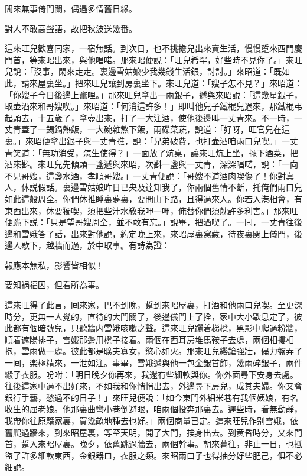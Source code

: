 \begin{myquote}
閒來無事倚門闌，偶遇多情舊日緣。

對人不敢高聲語，故把秋波送幾番。
\end{myquote}

這來旺兒歡喜囘家，一宿無話。到次日，也不挑擔兒出來賣生活，慢慢踅來西門慶門首，等來昭出來，與他唱喏。那來昭便說：「旺兒希罕，好些時不見你了。」來旺兒說：「沒事，閑來走走。裏邊雪姑娘少我幾錢生活銀，討討。」來昭道：「既如此，請來屋裏坐。」把來旺兒讓到房裏坐下。來旺兒道：「嫂子怎不見？」來昭道：「你嫂子今日後邊上竃哩。」那來旺兒拿出一兩銀子，遞與來昭說：「這幾星銀子，取壶酒來和哥嫂喫。」來昭道：「何消這許多！」即叫他兒子鐵棍兒過來，那鐵棍弔起頭去，十五歲了，拿壺出來，打了一大注酒，使他後邊叫一丈青來。不一時，一丈青蓋了一錫鍋熱飯，一大碗雜熬下飯，兩碟菜蔬，說道：「好呀，旺官兒在這裏。」來昭便拿出銀子與一丈青瞧，說：「兄弟破費，也打壶酒咱兩口兒喫。」一丈青笑道：「無功消受，怎生使得？」一面放了炕桌，讓來旺炕上坐，擺下酒菜，把酒來斟。來旺兒先傾頭一盞遞與來昭，次斟一盞與一丈青，深深唱喏，說：「一向不見哥嫂，這盞水酒，孝順哥嫂。」一丈青便說：「哥嫂不道酒肉喫傷了！你對真人，休説假話。裏邊雪姑娘昨日已央及逹知我了，你兩個舊情不斷，托俺們兩口兒如此這般周全。你們休推睡裏夢裏，要問山下路，且得過來人。你若入港相會，有東西出來，休要獨喫，須把些汁水敎我呷一呷，俺替你們須躭許多利害。」那來旺便跪下説：「只是望哥嫂周全，並不敢有忘。」說畢，把酒喫了。一囘，一丈青往後邊和雪娥答了話，出來對他說，約定晚上來，來昭屋裏窝藏，待夜裏関上儀門，後邊人歇下，越牆而過，於中取事。有詩為證：

\begin{myquote}
報應本無私，影響皆相似！

要知祸福因，但看所為事。
\end{myquote}

這來旺得了此言，囘來家，巴不到晚，踅到來昭屋裏，打酒和他兩口兒喫。至更深時分，更無一人覺的，直待的大門關了，後邊儀門上了拴，家中大小歇息定了，彼此都有個暗號兒，只聽牆内雪娥咳嗽之聲。這來旺兒躧着梯櫈，黑影中爬過粉牆，順着遮陽排子，雪娥那邊用櫈子接着。兩個在西耳房堆馬鞍子去處，兩個相摟相抱，雲雨做一處。彼此都是曠夫寡女，慾心如火。那來旺兒纓鎗強壯，儘力盤弄了一囘，楽極精來，一泄如注。事畢，雪娥遞與他一包金銀首飾，幾兩碎銀子，兩件緞子衣服。吩咐：「明日晚夕你再來，我還有些細軟與你。你外面尋下安身去處。往後這家中過不出好來，不如我和你悄悄出去，外邊尋下房兒，成其夫婦。你又會銀行手藝，愁過不的日子！」來旺兒便說：「如今東門外細米巷有我個姨娘，有名收生的屈老娘。他那裏曲彎小巷倒避眼，咱兩個投奔那裏去。遲些時，看無動靜，我帶你往原籍家裏，買幾畝地種去也好。」兩個商量已定。這來旺兒作别雪娥，依舊爬過牆來，到來昭屋裏，等至天明，開了大門，挨身出去。到黄昏時分，又來門首，踅入來昭屋裏。晚夕，依舊跳過牆去，兩個幹事。朝來暮往，非止一日，也抵盜了許多細軟東西，金銀器皿，衣服之類。來昭兩口子也得抽分好些肥己，俱不必細說。

